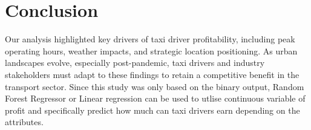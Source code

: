 \documentclass[11pt]{article}
\begin{document}
\section{Conclusion}
Our analysis highlighted key drivers of taxi driver profitability, including peak operating hours, weather impacts, and strategic location positioning. As urban landscapes evolve, especially post-pandemic, taxi drivers and industry stakeholders must adapt to these findings to retain a competitive benefit in the transport sector. Since this study was only based on the binary output, Random Forest Regressor or Linear regression can be used to utlise continuous variable of profit and specifically predict how much can taxi drivers earn depending on the attributes.

\clearpage

\printbibliography
\end{document}
